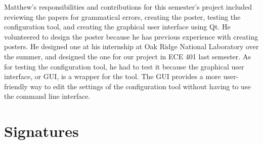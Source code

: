 \documentclass[12 pt]{article}
\begin{document}
	Matthew's responsibilities and contributions for this semester's project included reviewing the papers for grammatical errors, creating the poster, testing the configuration tool, and creating the graphical user interface using Qt. He volunteered to design the poster because he has previous experience with creating posters. He designed one at his internship at Oak Ridge National Laboratory over the summer, and designed the one for our project in ECE 401 last semester. As for testing the configuration tool, he had to test it because the graphical user interface, or GUI, is a wrapper for the tool. The GUI provides a more user-friendly way to edit the settings of the configuration tool without having to use the command line interface.
	\section{Signatures}
\end{document}
